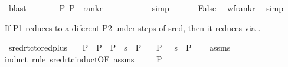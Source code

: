 \begin{isabellebody}
\ blast\isanewline
\ \ \ \ \isamarkupfalse%
\ \isamarkupfalse%
\ {\isachardoublequoteopen}{\isacharparenleft}{\kern0pt}P{\isacharcomma}{\kern0pt}\ P{\isacharparenright}{\kern0pt}\ {\isasymin}\ rank{\isacharunderscore}{\kern0pt}r{\isachardoublequoteclose}\ \isanewline
\ \ \ \ \ \ \isamarkupfalse%
\ {}{\isacharparenleft}{\kern0pt}{}{\isacharparenright}{\kern0pt}\ \isamarkupfalse%
\ simp\isanewline
\ \ \isamarkupfalse%
\isanewline
\ \ \isamarkupfalse%
\ {\isachardoublequoteopen}False{\isachardoublequoteclose}\ \isamarkupfalse%
\ wf{\isacharunderscore}{\kern0pt}rank{\isacharunderscore}{\kern0pt}r\ \isamarkupfalse%
\ simp\isanewline
{}\isamarkupfalse%
%
\endisatagproof
{\isafoldproof}%
%
\isadelimproof
%
\endisadelimproof
%
\begin{isamarkuptext}%
If P1 reduces to a diferent P2 under steps of sred, then it reduces via .%
\end{isamarkuptext}\isamarkuptrue%
\isamarkupfalse%
\ sred{\isacharunderscore}{\kern0pt}rtc{\isacharunderscore}{\kern0pt}to{\isacharunderscore}{\kern0pt}redplus{\isacharcolon}{\kern0pt}\isanewline
\ \ \ {\isachardoublequoteopen}P{}\ {\isasymnoteq}\ P{}{\isachardoublequoteclose}\ \ {\isachardoublequoteopen}P{}\ {\isasymturnstile}\ s\ {\isasymleadsto}\isactrlsup {\isacharasterisk}{\kern0pt}\ P{}{\isachardoublequoteclose}\isanewline
\ \ \ {\isachardoublequoteopen}P{}\ {\isasymTurnstile}\ {\isacharparenleft}{\kern0pt}{\isacharbraceleft}{\kern0pt}{\isacharbraceright}{\kern0pt}{\isacharcomma}{\kern0pt}\ s{\isacharparenright}{\kern0pt}\ {\isasymRightarrow}\ P{}{\isachardoublequoteclose}\isanewline
%
\isadelimproof
\ \ %
\endisadelimproof
%
\isatagproof
{}\isamarkupfalse%
\ assms\isanewline
{}\isamarkupfalse%
{\isacharparenleft}{\kern0pt}induct\ rule{\isacharcolon}{\kern0pt}\ sred{\isacharunderscore}{\kern0pt}rtc{\isachardot}{\kern0pt}induct{\isacharbrackleft}{\kern0pt}OF\ assms{\isacharparenleft}{\kern0pt}{}{\isacharparenright}{\kern0pt}{\isacharbrackright}{\kern0pt}{\isacharparenright}{\kern0pt}\isanewline
\ \ \isamarkupfalse%
\ {\isacharparenleft}{\kern0pt}{}\ P{}{\isacharparenright}{\kern0pt}\isanewline

\end{isabellebody}
